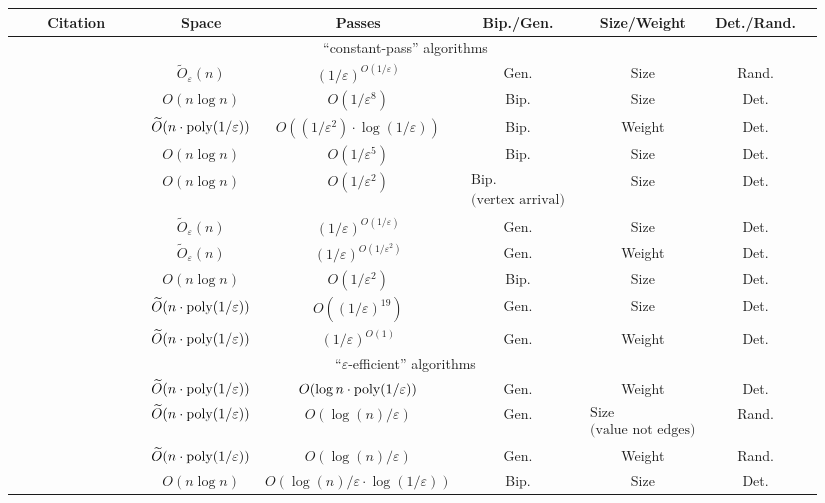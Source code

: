\documentclass{article}
\newcommand{\Ot}{\widetilde{O}}
\newcommand{\eps}{\varepsilon}
\newcommand{\poly}{\mbox{\rm poly}}
\begin{document}
\begin{table}[h!]
{\begin{tabular}{|c | c | c | c | c | c | c |}
 \hline
  ~~~~Citation~~~~ & ~~Space~~ & ~~~~Passes~~~~ & Bip./Gen. & Size/Weight & Det./Rand.  \\ 
  \hline\hline
  \multicolumn{6}{|c|}{``constant-pass'' algorithms} \\
  \hline\hline
  \cite{McGregor05} & $\Ot_{\eps}(n)$ & $(1/\eps)^{O(1/\eps)}$ & Gen. & Size & Rand.  \\
  \hline
  \cite{EggertKS09} & $O(n\log{n})$ & $O(1/\eps^{8})$ & Bip. & Size & Det.  \\
  \hline
  \cite{AhnG11} & $\Ot(n \cdot \poly{(1/\eps)})$ & $O((1/\eps^2) \cdot \log{(1/\eps)})$ & Bip. & Weight & Det. \\ 
  \hline
  \cite{EggertKMS12} & $O(n\log{n})$ & $O(1/\eps^{5})$  & Bip. & Size & Det. \\
  \hline
  \cite{Kapralov13} & $O(n\log{n})$ & $O(1/\eps^2)$ & {\large $\substack{\text{Bip.} \\ \text{(vertex arrival)}}$} & Size & Det. \\
  \hline
  \cite{Tirodkar18} & $\Ot_{\eps}(n)$ & $(1/\eps)^{O(1/\eps)}$ & Gen. & Size & Det. \\
  \hline
  \cite{GamlathKMS19} & $\Ot_{\eps}(n)$ & $(1/\eps)^{O(1/\eps^2)}$ & Gen. & Weight & Det. \\
  \hline
  \cite{AssadiLT21} & $O(n\log{n})$ & $O(1/\eps^2)$ & Bip. & Size & Det. \\
    \hline
  \cite{FischerMU22} & $\Ot(n \cdot \poly{(1/\eps)})$ & $O((1/\eps)^{19})$ & Gen. & Size & Det. \\
  \hline
  \cite{HuangS23} & $\Ot(n \cdot \poly{(1/\eps)})$ & ${(1/\eps)^{O(1)}}$  & Gen. & Weight & Det. \\
  \hline\hline
  \multicolumn{6}{|c|}{``$\eps$-efficient'' algorithms} \\
  \hline\hline
  \cite{AhnG11} & $\Ot(n \cdot \poly{(1/\eps)})$ & $O(\log{n} \cdot \poly{(1/\eps)})$ & Gen. & Weight & Det. \\
\hline
  \cite{AhnG11b} & $\Ot(n \cdot \poly{(1/\eps)})$ & $O(\log{\!(n)}/\eps)$ & Gen. & {\large $\substack{\text{Size} \\ \text{(value not edges)}}$} & Rand. \\
  \hline
  \cite{AhnG15} & $\Ot(n \cdot \poly{(1/\eps)})$ & $O(\log{\!(n)}/\eps)$ & Gen. & Weight & Rand. \\
  \hline
  \cite{AssadiJJST22} & $O(n\log{n})$ & $O(\log{\!(n)}/\eps \cdot \log{(1/\eps)})$ & Bip. & Size & Det. \\

\end{tabular}}
\end{table}
\end{document}
